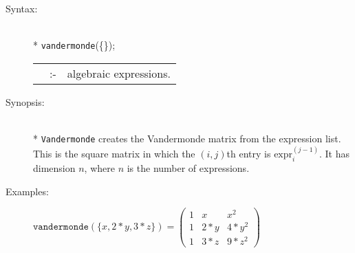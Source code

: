 \begin{description}
\item[Syntax:]\mbox{}\\*
\texttt{vandermonde}(\{\exprlist{}\});
\lazyfootnote{}\\[2mm]
\begin{tabular}{l l l}
\exprlist{} &:-& algebraic expressions.
\end{tabular}

\item[Synopsis:]\mbox{}\\*
  \texttt{Vandermonde} creates the Vandermonde matrix from the expression list.
  This is the square matrix in which the $(i,j)$th entry is $\text{expr}_i^{(j-1)}$.
  It has dimension $n$, where $n$ is the number of expressions.

\item[Examples:]
\begin{flushleft}  
\begin{math}  
  \texttt{vandermonde}(\{x,2*y,3*z\}) =
  \begin{pmatrix} 1 & x & x^2 \\ 1 & 2*y & 4*y^2 \\ 1 & 3*z & 9*z^2 \end{pmatrix}
\end{math}  
\end{flushleft}
\end{description}

